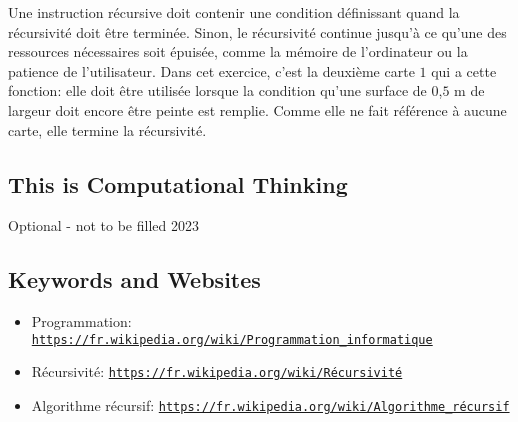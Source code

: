\documentclass[a4paper,11pt]{report}
\newcommand{\BrochureUrlText}[1]{\texttt{#1}}
\begin{document}
Une instruction récursive doit contenir une condition définissant quand la récursivité doit être terminée. Sinon, le récursivité continue jusqu’à ce qu’une des ressources nécessaires soit épuisée, comme la mémoire de l’ordinateur ou la patience de l’utilisateur. Dans cet exercice, c’est la deuxième carte $1$ qui a cette fonction: elle doit être utilisée lorsque la condition qu’une surface de $0$,$5$ m de largeur doit encore être peinte est remplie. Comme elle ne fait référence à aucune carte, elle termine la récursivité.


\subsection*{This is Computational Thinking}

Optional - not to be filled 2023

{\raggedright

\subsection*{Keywords and Websites}

\begin{itemize}
  \item Programmation: \href{https://fr.wikipedia.org/wiki/Programmation_informatique}{\BrochureUrlText{https://fr.wikipedia.org/wiki/Programmation\_informatique}}
  \item Récursivité: \href{https://fr.wikipedia.org/wiki/R\%C3\%A9cursivit\%C3\%A9}{\BrochureUrlText{https://fr.wikipedia.org/wiki/Récursivité}}
  \item Algorithme récursif: \href{https://fr.wikipedia.org/wiki/Algorithme_r\%C3\%A9cursif}{\BrochureUrlText{https://fr.wikipedia.org/wiki/Algorithme\_récursif}}
\end{itemize}


}
\end{document}
